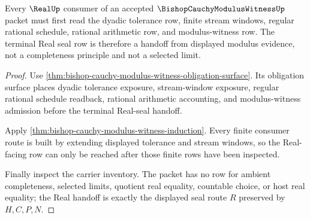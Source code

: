 \begin{theorem}
\label{thm:bishop-cauchy-modulus-witness-real-handoff}
Every $\RealUp$ consumer of an accepted $\BishopCauchyModulusWitnessUp$ packet must first read the dyadic tolerance row, finite stream windows, regular rational schedule, rational arithmetic row, and modulus-witness row. The terminal Real seal row is therefore a handoff from displayed modulus evidence, not a completeness principle and not a selected limit.
\end{theorem}
\begin{proof}
Use \autoref{thm:bishop-cauchy-modulus-witness-obligation-surface}. Its obligation surface places dyadic tolerance exposure, stream-window exposure, regular rational schedule readback, rational arithmetic accounting, and modulus-witness admission before the terminal Real-seal handoff.

Apply \autoref{thm:bishop-cauchy-modulus-witness-induction}. Every finite consumer route is built by extending displayed tolerance and stream windows, so the Real-facing row can only be reached after those finite rows have been inspected.

Finally inspect the carrier inventory. The packet has no row for ambient completeness, selected limits, quotient real equality, countable choice, or host real equality; the Real handoff is exactly the displayed seal route $R$ preserved by $H,C,P,N$.
\end{proof}




